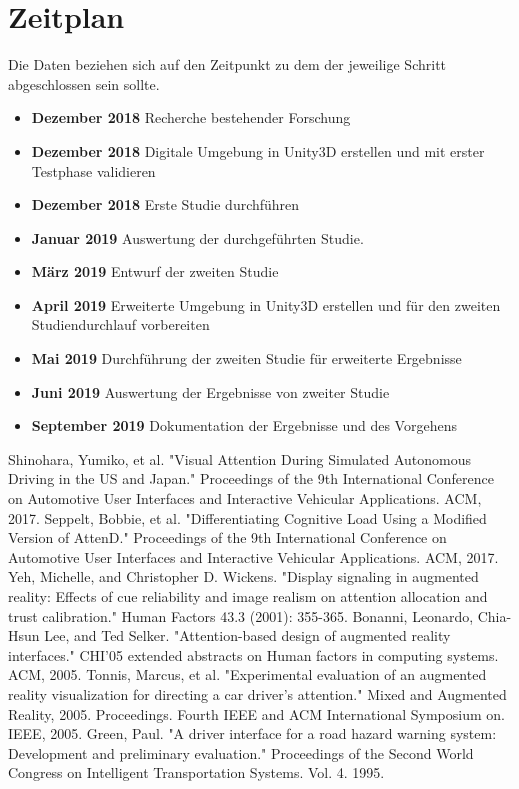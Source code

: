 \documentclass[a4paper, 11pt]{article}
\begin{document}
\section*{Zeitplan}
Die Daten beziehen sich auf den Zeitpunkt zu dem der jeweilige Schritt abgeschlossen sein sollte.
\begin{itemize}
    \item \textbf{Dezember 2018} Recherche bestehender Forschung
    \item \textbf{Dezember 2018} Digitale Umgebung in Unity3D erstellen und mit erster Testphase validieren
    \item \textbf{Dezember 2018} Erste Studie durchführen
    \item \textbf{Januar 2019} Auswertung der durchgeführten Studie.
    \item \textbf{März 2019} Entwurf der zweiten Studie
    \item \textbf{April 2019} Erweiterte Umgebung in Unity3D erstellen und für den zweiten Studiendurchlauf vorbereiten
    \item \textbf{Mai 2019} Durchführung der zweiten Studie für erweiterte Ergebnisse
    \item \textbf{Juni 2019} Auswertung der Ergebnisse von zweiter Studie
    \item \textbf{September 2019} Dokumentation der Ergebnisse und des Vorgehens
\end{itemize}

\begin{thebibliography}{9}
 Shinohara, Yumiko, et al. "Visual Attention During Simulated Autonomous Driving in the US and Japan." Proceedings of the 9th International Conference on Automotive User Interfaces and Interactive Vehicular Applications. ACM, 2017.
 Seppelt, Bobbie, et al. "Differentiating Cognitive Load Using a Modified Version of AttenD." Proceedings of the 9th International Conference on Automotive User Interfaces and Interactive Vehicular Applications. ACM, 2017.
 Yeh, Michelle, and Christopher D. Wickens. "Display signaling in augmented reality: Effects of cue reliability and image realism on attention allocation and trust calibration." Human Factors 43.3 (2001): 355-365.
 Bonanni, Leonardo, Chia-Hsun Lee, and Ted Selker. "Attention-based design of augmented reality interfaces." CHI'05 extended abstracts on Human factors in computing systems. ACM, 2005.
 Tonnis, Marcus, et al. "Experimental evaluation of an augmented reality visualization for directing a car driver's attention." Mixed and Augmented Reality, 2005. Proceedings. Fourth IEEE and ACM International Symposium on. IEEE, 2005.
 Green, Paul. "A driver interface for a road hazard warning system: Development and preliminary evaluation." Proceedings of the Second World Congress on Intelligent Transportation Systems. Vol. 4. 1995.
\end{thebibliography}
\end{document}
